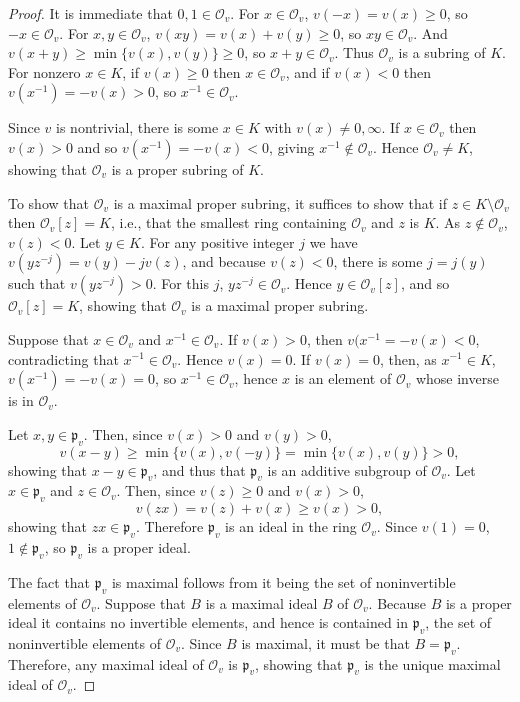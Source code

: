 \documentclass{article}
\theoremstyle{plain}
\theoremstyle{definition}
\begin{document}
\begin{proof}
It is immediate that $0,1 \in \mathcal{O}_v$. For $x \in \mathcal{O}_v$, $v(-x)=v(x) \geq 0$, so
$-x \in \mathcal{O}_v$. For $x,y \in \mathcal{O}_v$, $v(xy)=v(x)+v(y) \geq 0$, so $xy \in \mathcal{O}_v$. 
And
$v(x+y) \geq \min\{v(x),v(y)\} \geq 0$, so $x+y \in \mathcal{O}_v$.
Thus
$\mathcal{O}_v$ is a subring of $K$. 
For nonzero $x \in K$, if $v(x) \geq 0$ then $x \in \mathcal{O}_v$, and if
$v(x)<0$ then $v(x^{-1})=-v(x)>0$, so $x^{-1} \in \mathcal{O}_v$.

Since $v$ is nontrivial, there is some $x \in K$ with $v(x) \neq 0, \infty$. If $x \in \mathcal{O}_v$ then
$v(x)>0$ and
so $v(x^{-1})=-v(x)<0$, giving $x^{-1} \not \in \mathcal{O}_v$. Hence $\mathcal{O}_v \neq K$, showing
that $\mathcal{O}_v$ is a proper subring of $K$. 

To show that $\mathcal{O}_v$ is a maximal proper subring, it suffices to show that
if $z \in K \setminus \mathcal{O}_v$ then $\mathcal{O}_v[z] = K$, i.e., that the smallest ring containing
$\mathcal{O}_v$ and $z$ is $K$. As $z \not \in \mathcal{O}_v$, $v(z)<0$.
Let $y \in K$. For any positive integer $j$ we have $v(y z^{-j})=v(y)-jv(z)$, and because
$v(z)<0$, there is some
$j=j(y)$ such that $v(yz^{-j})>0$. For this $j$, $yz^{-j} \in \mathcal{O}_v$. Hence
$y \in \mathcal{O}_v[z]$, and so $\mathcal{O}_v[z] = K$, showing that $\mathcal{O}_v$ is a maximal
proper subring.

Suppose that $x \in \mathcal{O}_v$ and $x^{-1} \in \mathcal{O}_v$. If $v(x)>0$, then
$v(x^{-1}=-v(x)<0$, contradicting that $x^{-1} \in \mathcal{O}_v$. Hence $v(x)=0$. 
If $v(x)=0$, then, as $x^{-1} \in K$, $v(x^{-1})=-v(x)=0$, so $x^{-1} \in \mathcal{O}_v$, hence
$x$ is an element of $\mathcal{O}_v$ whose inverse is in $\mathcal{O}_v$.

Let $x,y \in  \mathfrak{p}_v$. Then, since $v(x)>0$ and $v(y)>0$,
\[
v(x-y) \geq \min\{v(x),v(-y)\}=
\min\{v(x),v(y)\} >0,
\]
showing that $x-y \in \mathfrak{p}_v$, and thus that $\mathfrak{p}_v$ is an additive subgroup
of $\mathcal{O}_v$. Let $x \in \mathfrak{p}_v$ and $z \in \mathcal{O}_v$.  
Then, since $v(z) \geq 0$ and $v(x)>0$,
\[
v(zx)=v(z)+v(x) \geq v(x)>0,
\]
showing that $zx \in \mathfrak{p}_v$. Therefore $\mathfrak{p}_v$ is an ideal in the ring
$\mathcal{O}_v$. Since $v(1)=0$, $1 \not \in \mathfrak{p}_v$, so $\mathfrak{p}_v$ is a proper
ideal. 

The fact that $\mathfrak{p}_v$ is maximal follows from it being the set of noninvertible elements
of $\mathcal{O}_v$. Suppose that $B$ is a maximal ideal $B$ of
$\mathcal{O}_v$.  Because $B$ is a proper ideal it contains
no invertible elements, and hence is contained in $\mathfrak{p}_v$, the set of noninvertible
elements of $\mathcal{O}_v$. Since $B$ is maximal, it must be that $B=\mathfrak{p}_v$.
Therefore, any maximal ideal of $\mathcal{O}_v$ is $\mathfrak{p}_v$, showing that
$\mathfrak{p}_v$ is the unique maximal ideal of $\mathcal{O}_v$.
\end{proof}
\end{document}
